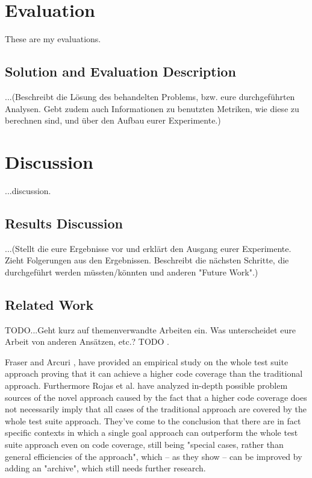 \documentclass[pdftex,english,oribibl]{llncs}
\begin{document}
\section{Evaluation}\label{sec:evaluation}

  These are my evaluations.
  
  \subsection{Solution and Evaluation Description}
  
  ...(Beschreibt die Lösung des behandelten Problems, bzw. eure durchgeführten Analysen. Gebt zudem auch Informationen zu benutzten Metriken, wie diese zu berechnen sind, und über den Aufbau eurer Experimente.)
  
  
\section{Discussion}\label{sec:discussion}

  ...discussion.
  
    \subsection{Results Discussion} 
    ...(Stellt die eure Ergebnisse vor und erklärt den Ausgang eurer Experimente. Zieht Folgerungen aus den Ergebnissen. Beschreibt die nächsten Schritte, die durchgeführt werden müssten/könnten und anderen "Future Work".)
    
    \subsection{Related Work}
    TODO...Geht kurz auf themenverwandte Arbeiten ein. Was unterscheidet eure Arbeit von anderen Ansätzen, etc.? TODO .
    
    Fraser and Arcuri \cite{fraser2013whole}, \citep{fraser2015achieving} have provided an empirical study on the whole test suite approach proving that it can achieve a higher code coverage than the traditional approach.
    Furthermore Rojas et al. \citep{rojas2017detailed} have analyzed in-depth possible problem sources of the novel approach caused by the fact that a higher code coverage does not necessarily imply that all cases of the traditional approach are covered by the whole test suite approach. They've come to the conclusion that there are in fact specific contexts in which a single goal approach can outperform the whole test suite approach even on code coverage, still being "special cases, rather than general efficiencies of the approach", which -- as they show -- can be improved by adding an "archive", which still needs further research.
    
\end{document}
